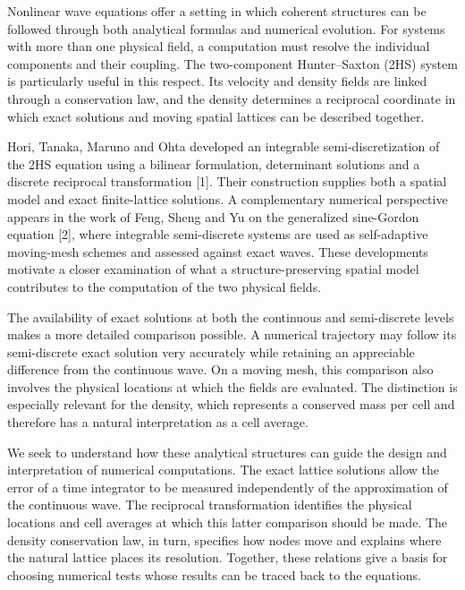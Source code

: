 \documentclass[11pt,a4paper]{article}
\begin{document}
Nonlinear wave equations offer a setting in which coherent structures can be followed through both analytical formulas and numerical evolution. For systems with more than one physical field, a computation must resolve the individual components and their coupling. The two-component Hunter–Saxton (2HS) system is particularly useful in this respect. Its velocity and density fields are linked through a conservation law, and the density determines a reciprocal coordinate in which exact solutions and moving spatial lattices can be described together.

Hori, Tanaka, Maruno and Ohta developed an integrable semi-discretization of the 2HS equation using a bilinear formulation, determinant solutions and a discrete reciprocal transformation [1]. Their construction supplies both a spatial model and exact finite-lattice solutions. A complementary numerical perspective appears in the work of Feng, Sheng and Yu on the generalized sine-Gordon equation [2], where integrable semi-discrete systems are used as self-adaptive moving-mesh schemes and assessed against exact waves. These developments motivate a closer examination of what a structure-preserving spatial model contributes to the computation of the two physical fields.

The availability of exact solutions at both the continuous and semi-discrete levels makes a more detailed comparison possible. A numerical trajectory may follow its semi-discrete exact solution very accurately while retaining an appreciable difference from the continuous wave. On a moving mesh, this comparison also involves the physical locations at which the fields are evaluated. The distinction is especially relevant for the density, which represents a conserved mass per cell and therefore has a natural interpretation as a cell average.

We seek to understand how these analytical structures can guide the design and interpretation of numerical computations. The exact lattice solutions allow the error of a time integrator to be measured independently of the approximation of the continuous wave. The reciprocal transformation identifies the physical locations and cell averages at which this latter comparison should be made. The density conservation law, in turn, specifies how nodes move and explains where the natural lattice places its resolution. Together, these relations give a basis for choosing numerical tests whose results can be traced back to the equations.
\end{document}
